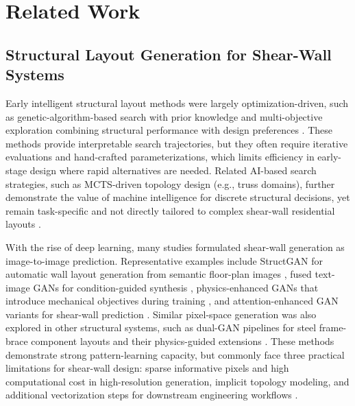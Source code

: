 \section{Related Work}
\label{sec:related}

\subsection{Structural Layout Generation for Shear-Wall Systems}
\label{subsec:structural_layout_generation}

Early intelligent structural layout methods were largely optimization-driven, such as genetic-algorithm-based search with prior knowledge and multi-objective exploration combining structural performance with design preferences \cite{zhouAutomatedStructuralDesign2022b,muellerCombiningStructuralPerformance2015,zhangShearWallLayout2017,louPracticalShearWall2021c,louShearWallLayout2021}. These methods provide interpretable search trajectories, but they often require iterative evaluations and hand-crafted parameterizations, which limits efficiency in early-stage design where rapid alternatives are needed. Related AI-based search strategies, such as MCTS-driven topology design (e.g., truss domains), further demonstrate the value of machine intelligence for discrete structural decisions, yet remain task-specific and not directly tailored to complex shear-wall residential layouts \cite{luoAlphaTrussMonteCarlo2022a,hayashiGraphbasedReinforcementLearning2022}.

With the rise of deep learning, many studies formulated shear-wall generation as image-to-image prediction. Representative examples include StructGAN for automatic wall layout generation from semantic floor-plan images \cite{liaoAutomatedStructuralDesign2021a}, fused text-image GANs for condition-guided synthesis \cite{liaoIntelligentGenerativeStructural2022a}, physics-enhanced GANs that introduce mechanical objectives during training \cite{luIntelligentStructuralDesign2022a}, and attention-enhanced GAN variants for shear-wall prediction \cite{zhaoIntelligentDesignShear2023}. Similar pixel-space generation was also explored in other structural systems, such as dual-GAN pipelines for steel frame-brace component layouts and their physics-guided extensions \cite{fuDualGenerativeAdversarial2023,fuPhysicalRuleguidedGenerative2024}. These methods demonstrate strong pattern-learning capacity, but commonly face three practical limitations for shear-wall design: sparse informative pixels and high computational cost in high-resolution generation, implicit topology modeling, and additional vectorization steps for downstream engineering workflows \cite{wangHighResolutionImageSynthesis2018,feiIntegratedSchematicDesign2022}.

